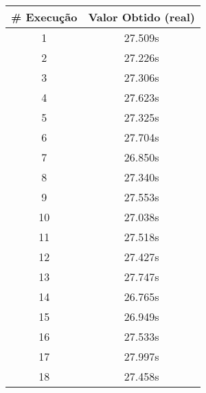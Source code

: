 \documentclass[11pt]{article}
\begin{document}
\begin{table}[!h]
\begin{center}
\begin{minipage}{0.48\textwidth}
\begin{tabular}{| c | c |}
			\hline
				\textbf{\# Execução} &  \textbf{Valor Obtido (real)} \\ \hline
				1 & 27.509s \\ \hline
				2 & 27.226s \\ \hline
				3 & 27.306s \\ \hline
				4 & 27.623s \\ \hline
				5 & 27.325s \\ \hline
				6 & 27.704s \\ \hline
				7 & 26.850s \\ \hline
				8 & 27.340s \\ \hline
				9 & 27.553s \\ \hline
				10 & 27.038s \\ \hline
				11 & 27.518s \\ \hline
				12 & 27.427s \\ \hline
				13 & 27.747s \\ \hline
				14 & 26.765s \\ \hline
				15 & 26.949s \\ \hline
				16 & 27.533s \\ \hline
				17 & 27.997s \\ \hline
				18 & 27.458s \\ \hline
			\end{tabular}
		\end{minipage}
	\end{center}
\end{table}
\end{document}
